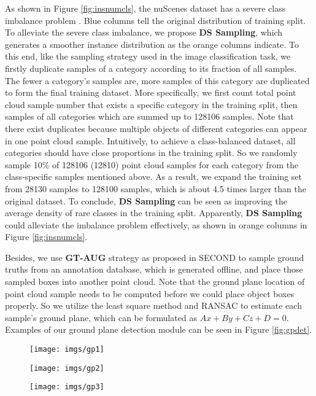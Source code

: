 \documentclass[10pt,twocolumn,letterpaper]{article}
\begin{document}
As shown in Figure \ref{fig:insnumcls}, the nuScenes dataset \cite{nuscenes} has a severe class imbalance problem . Blue columns tell the original distribution of training split. To alleviate the severe class imbalance, we propose \textbf{DS Sampling}, which generates a smoother instance distribution as the orange columns indicate. To this end, like the sampling strategy used in the image classification task, we firstly duplicate samples of a category according to its fraction of all samples. The fewer a category's samples are, more samples of this category are duplicated to form the final training dataset.  More specifically, we first count total point cloud sample number that exists a specific category in the training split, then samples of all categories which are summed up to 128106 samples. Note that there exist duplicates because multiple objects of different categories can appear in one point cloud sample. Intuitively, to achieve a class-balanced dataset, all categories should have close proportions in the training split. So we randomly sample 10\% of 128106 (12810) point cloud samples for each category from the class-specific samples mentioned above. As a result, we expand the training set from 28130 samples to 128100 samples, which is about 4.5 times larger than the original dataset. To conclude, \textbf{DS Sampling} can be seen as improving the average density of rare classes in the training split. Apparently, \textbf{DS Sampling} could alleviate the imbalance problem effectively, as shown in orange columns in Figure \ref{fig:insnumcls}.

Besides, we use \textbf{GT-AUG} strategy as proposed in SECOND \cite{Yan_2018} to sample ground truths from an annotation database, which is generated offline, and place those sampled boxes into another point cloud. Note that the ground plane location of point cloud sample needs to be computed before we could place object boxes properly. So we utilize the least square method and RANSAC \cite{Fischler1987Random} to estimate each sample's ground plane, which can be formulated as $Ax+By+Cz+D=0$. Examples of our ground plane detection module can be seen in Figure \ref{fig:gpdet}.

\begin{figure*}
\centering
\begin{subfigure}{.33\textwidth}
  \centering
  \texttt{[image: imgs/gp1]}
\label{fig:sub1}
\end{subfigure}\begin{subfigure}{.33\textwidth}
  \centering
  \texttt{[image: imgs/gp2]}
\label{fig:sub2}
\end{subfigure}
\begin{subfigure}{.33\textwidth}
  \centering
  \texttt{[image: imgs/gp3]}
\label{fig:sub3}
\end{subfigure}
\caption{\textbf{Examples of ground plane detection result.} Points belonging to ground plane are shown in color, which can be formulated by $Ax + By + Cz + D = 0$. In average, the ground plane is about -1.82 meters along z axis. Open3D \cite{DBLP:journals/corr/abs-1801-09847} is used for visualization.}
\label{fig:gpdet}
\end{figure*}
 
\end{document}

